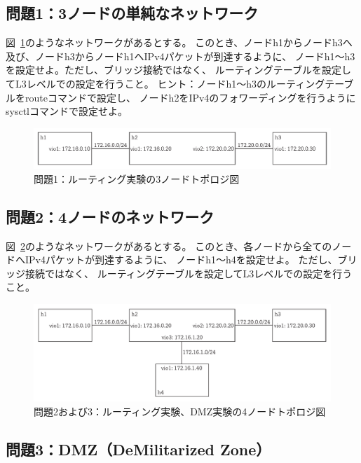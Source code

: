 \subsection{問題1：3ノードの単純なネットワーク}

図~\ref{fig:quiz01}のようなネットワークがあるとする。
このとき、ノードh1からノードh3へ及び、ノードh3からノードh1へIPv4パケットが到達するように、
ノードh1〜h3を設定せよ。ただし、ブリッジ接続ではなく、
ルーティングテーブルを設定してL3レベルでの設定を行うこと。
ヒント：ノードh1〜h3のルーティングテーブルをrouteコマンドで設定し、
ノードh2をIPv4のフォワーディングを行うようにsysctlコマンドで設定せよ。

\begin{figure}
    \centering
    \includegraphics[width=15cm,pagebox=artbox]{figs/quiz01.pdf}
    \caption{問題1：ルーティング実験の3ノードトポロジ図} \label{fig:quiz01}
\end{figure}

\subsection{問題2：4ノードのネットワーク}

図~\ref{fig:quiz02}のようなネットワークがあるとする。
このとき、各ノードから全てのノードへIPv4パケットが到達するように、
ノードh1〜h4を設定せよ。
ただし、ブリッジ接続ではなく、
ルーティングテーブルを設定してL3レベルでの設定を行うこと。

\begin{figure}
    \centering
    \includegraphics[width=15cm,pagebox=artbox]{figs/quiz02.pdf}
    \caption{問題2および3：ルーティング実験、DMZ実験の4ノードトポロジ図} \label{fig:quiz02}
\end{figure}

\subsection{問題3：DMZ（DeMilitarized Zone）}

